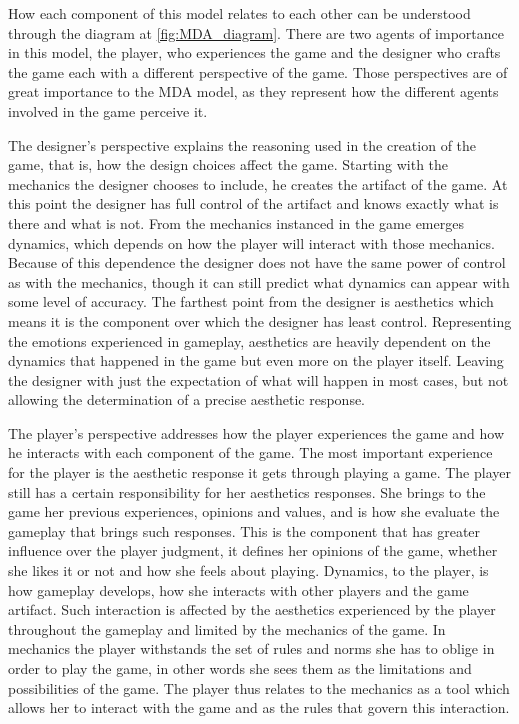 

How each component of this model relates to each other can be understood through the diagram at \autoref{fig:MDA_diagram}. There are two agents of importance in this model, the player, who experiences the game and the designer who crafts the game each with a different perspective of the game. Those perspectives are of great importance to the MDA model, as they represent how the different agents involved in the game perceive it. 

The designer's perspective explains the reasoning used in the creation of the game, that is, how the design choices affect the game. Starting with the mechanics the designer chooses to include, he creates the artifact of the game. At this point the designer has full control of the artifact and knows exactly what is there and what is not. From the mechanics instanced in the game emerges dynamics, which depends on how the player will interact with those mechanics. Because of this dependence the designer does not have the same power of control as with the mechanics, though it can still predict what dynamics can appear with some level of accuracy. The farthest point from the designer is aesthetics which means it is the component over which the designer has least control. Representing the emotions experienced in gameplay, aesthetics are heavily dependent on the dynamics that happened in the game but even more on the player itself. Leaving the designer with just the expectation of what will happen in most cases, but not allowing the determination of a precise aesthetic response. 

The player's perspective addresses how the player experiences the game and how he interacts with each component of the game. The most important experience for the player is the aesthetic response it gets through playing a game. The player still has a certain responsibility for her aesthetics responses. She brings to the game her previous experiences, opinions and values, and is how she evaluate the gameplay that brings such responses. This is the component that has greater influence over the player judgment, it defines her opinions of the game, whether she likes it or not and how she feels about playing. Dynamics, to the player, is how gameplay develops, how she interacts with other players and the game artifact. Such interaction is affected by the aesthetics experienced by the player throughout the gameplay and limited by the mechanics of the game. In mechanics the player withstands the set of rules and norms she has to oblige in order to play the game, in other words she sees them as the limitations and possibilities of the game. The player thus relates to the mechanics as a tool which allows her to interact with the game and as the rules that govern this interaction. 

